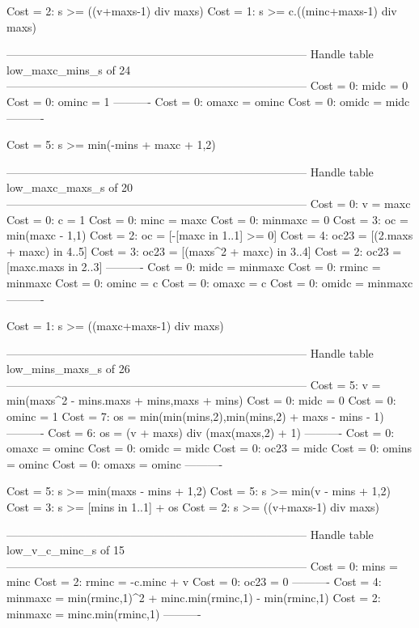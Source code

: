 Cost =  2:  s >= ((v+maxs-1) div maxs)
Cost =  1:  s >= c.((minc+maxs-1) div maxs)

--------------------------------------------------------------------------------
Handle table low_maxc_mins_s of 24
--------------------------------------------------------------------------------
Cost =  0:  midc  = 0
Cost =  0:  ominc = 1
----------
Cost =  0:  omaxc = ominc
Cost =  0:  omidc = midc
----------

Cost =  5:  s >= min(-mins + maxc + 1,2)

--------------------------------------------------------------------------------
Handle table low_maxc_maxs_s of 20
--------------------------------------------------------------------------------
Cost =  0:  v       = maxc
Cost =  0:  c       = 1
Cost =  0:  minc    = maxc
Cost =  0:  minmaxc = 0
Cost =  3:  oc      = min(maxc - 1,1)
Cost =  2:  oc      = [-[maxc in 1..1] >= 0]
Cost =  4:  oc23    = [(2.maxs + maxc) in 4..5]
Cost =  3:  oc23    = [(maxs^2 + maxc) in 3..4]
Cost =  2:  oc23    = [maxc.maxs in 2..3]
----------
Cost =  0:  midc    = minmaxc
Cost =  0:  rminc   = minmaxc
Cost =  0:  ominc   = c
Cost =  0:  omaxc   = c
Cost =  0:  omidc   = minmaxc
----------

Cost =  1:  s >= ((maxc+maxs-1) div maxs)

--------------------------------------------------------------------------------
Handle table low_mins_maxs_s of 26
--------------------------------------------------------------------------------
Cost =  5:  v     = min(maxs^2 - mins.maxs + mins,maxs + mins)
Cost =  0:  midc  = 0
Cost =  0:  ominc = 1
Cost =  7:  os    = min(min(mins,2),min(mins,2) + maxs - mins - 1)
----------
Cost =  6:  os    = (v + maxs) div (max(maxs,2) + 1)
----------
Cost =  0:  omaxc = ominc
Cost =  0:  omidc = midc
Cost =  0:  oc23  = midc
Cost =  0:  omins = ominc
Cost =  0:  omaxs = ominc
----------

Cost =  5:  s >= min(maxs - mins + 1,2)
Cost =  5:  s >= min(v - mins + 1,2)
Cost =  3:  s >= [mins in 1..1] + os
Cost =  2:  s >= ((v+maxs-1) div maxs)

--------------------------------------------------------------------------------
Handle table low_v_c_minc_s of 15
--------------------------------------------------------------------------------
Cost =  0:  mins    = minc
Cost =  2:  rminc   = -c.minc + v
Cost =  0:  oc23    = 0
----------
Cost =  4:  minmaxc = min(rminc,1)^2 + minc.min(rminc,1) - min(rminc,1)
Cost =  2:  minmaxc = minc.min(rminc,1)
----------

